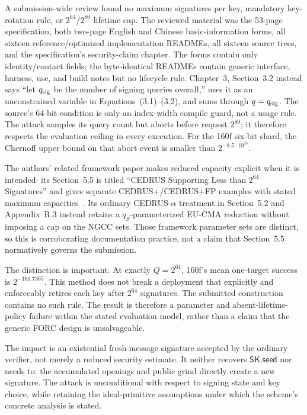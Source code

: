 \documentclass[11pt,a4paper]{article}
\newcommand{\sk}{\ensuremath{\mathsf{SK}}}
\begin{document}
A submission-wide review found no maximum signatures per key, mandatory
key-rotation rule, or $2^{64}$/$2^{80}$ lifetime cap.  The reviewed material
was the 53-page specification, both two-page English and Chinese
basic-information forms, all sixteen reference/optimized implementation
READMEs, all sixteen source trees, and the specification's security-claim
chapter.  The forms contain only identity/contact fields; the byte-identical
READMEs contain generic interface, harness, use, and build notes but no
lifecycle rule.  Chapter~3, Section~3.2 instead says
``let $q_{\rm sig}$ be the number of signing queries overall,'' uses it as an
unconstrained variable in Equations~(3.1)--(3.2), and sums through
$q=q_{\rm sig}$.  The source's 64-bit condition is only an index-width compile
guard, not a usage rule.  The attack samples its query count but
aborts before request $2^{80}$; it therefore respects the evaluation ceiling
in every execution.  For the 160f six-bit shard, the Chernoff upper bound on
that abort event is smaller than $2^{-8.5\cdot10^{24}}$.

The authors' related framework paper makes reduced capacity explicit when it
is intended: its Section~5.5 is titled ``CEDRUS Supporting Less than $2^{64}$
Signatures'' and gives separate CEDRUS+/CEDRUS+FP examples with stated maximum
capacities~\cite{cedrus-framework}.  Its ordinary CEDRUS-$\alpha$ treatment in
Section~5.2 and Appendix~R.3 instead retains a $q_S$-parameterized EU-CMA
reduction without imposing a cap on the NGCC sets.  Those framework parameter
sets are distinct, so this is corroborating documentation practice, not a
claim that Section~5.5 normatively governs the submission.

The distinction is important.  At exactly $Q=2^{64}$, 160f's mean one-target
success is $2^{-161.7365}$.  This method does not break a deployment that
explicitly and enforceably retires each key after $2^{64}$ signatures.  The
submitted construction contains no such rule.  The result is therefore a
parameter and absent-lifetime-policy failure within the stated evaluation
model, rather than a claim that the generic FORC design is unsalvageable.

The impact is an existential fresh-message signature accepted by the ordinary
verifier, not merely a reduced security estimate.  It neither recovers
$\sk.\mathsf{seed}$ nor needs to: the accumulated openings and public grind
directly create a new signature.  The attack is unconditional with respect to
signing state and key choice, while retaining the ideal-primitive assumptions
under which the scheme's concrete analysis is stated.
\end{document}
